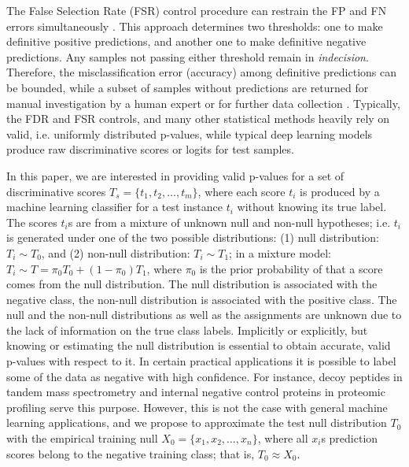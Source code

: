 \documentclass[10pt,letterpaper]{article}
\begin{document}
The False Selection Rate (FSR) control procedure can restrain the FP and FN errors simultaneously \cite{zhao2023controlling}.
This approach determines two thresholds: one to make definitive positive predictions, and another one to make definitive negative predictions.
Any samples not passing either threshold remain in {\em indecision}.
Therefore, the misclassification error (accuracy) among definitive predictions can be bounded, while a subset of samples without predictions are returned for manual investigation by a human expert or for further data collection \cite{rava2021burden}.
Typically, the FDR and FSR controls, and many other statistical methods heavily rely on valid, i.e. uniformly distributed p-values, while typical deep learning models produce raw discriminative scores or logits for test samples. 

In this paper, we are interested in providing valid p-values for a set of discriminative scores $T_s=\{t_1, t_2, \dots, t_m\}$, where each score $t_i$ is produced by a machine learning classifier for a test instance $t_i$ without knowing its true label.
The scores $t_i$s are from a mixture of unknown null and non-null hypotheses; i.e. $t_i$ is generated under one of the two possible distributions: (1) null distribution: $T_i\sim T_0$, and (2) non-null distribution: $T_i\sim T_1$; in a mixture model: $T_i\sim T=\pi_0 T_0 + (1-\pi_0)T_1$, where $\pi_0$ is the prior probability of that a score comes from the null distribution.
The null distribution is associated with the negative class, the non-null distribution is associated with the positive class.
The null and the non-null distributions as well as the assignments are unknown due to the lack of information on the true class labels.
Implicitly or explicitly, but knowing or estimating the null distribution is essential to obtain accurate, valid p-values with respect to it.
In certain practical applications it is possible to label some of the data as negative with high confidence.
For instance, decoy peptides \cite{elias2007target} in tandem mass spectrometry and internal negative control proteins \cite{gao2023simultaneous} in proteomic profiling serve this purpose.
However, this is not the case with general machine learning applications, and we propose to approximate the test null distribution $T_0$ with the empirical training null $X_0 = \{x_1, x_2, \dots, x_n\}$, where all $x_i$s prediction scores belong to the negative training class; that is, $T_0 \approx X_0 $.
\end{document}
